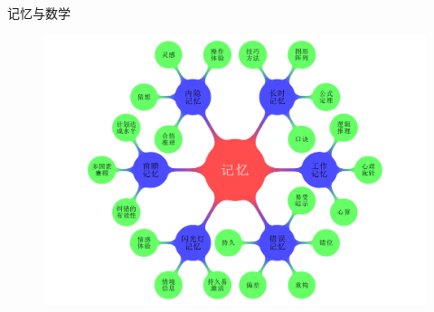 \documentclass[serif]{beamer}
\begin{document}
  \begin{frame}{记忆与数学}
       \begin{figure}[t]
       	     \centering
       	    \includegraphics[scale=0.4]{memory.pdf}
       \end{figure}
  \end{frame}
\end{document}
